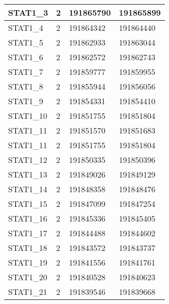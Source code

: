 \begin{longtable}{| p{} | C{.10\textwidth} | C{.35\textwidth} | C{.35\textwidth} |}
STAT1\_3                & 2            & 191865790             & 191865899           \\ \hline
STAT1\_4                & 2            & 191864342             & 191864440           \\ \hline
STAT1\_5                & 2            & 191862933             & 191863044           \\ \hline
STAT1\_6                & 2            & 191862572             & 191862743           \\ \hline
STAT1\_7                & 2            & 191859777             & 191859955           \\ \hline
STAT1\_8                & 2            & 191855944             & 191856056           \\ \hline
STAT1\_9                & 2            & 191854331             & 191854410           \\ \hline
STAT1\_10               & 2            & 191851755             & 191851804           \\ \hline
STAT1\_11               & 2            & 191851570             & 191851683           \\ \hline
STAT1\_11               & 2            & 191851755             & 191851804           \\ \hline
STAT1\_12               & 2            & 191850335             & 191850396           \\ \hline
STAT1\_13               & 2            & 191849026             & 191849129           \\ \hline
STAT1\_14               & 2            & 191848358             & 191848476           \\ \hline
STAT1\_15               & 2            & 191847099             & 191847254           \\ \hline
STAT1\_16               & 2            & 191845336             & 191845405           \\ \hline
STAT1\_17               & 2            & 191844488             & 191844602           \\ \hline
STAT1\_18               & 2            & 191843572             & 191843737           \\ \hline
STAT1\_19               & 2            & 191841556             & 191841761           \\ \hline
STAT1\_20               & 2            & 191840528             & 191840623           \\ \hline
STAT1\_21               & 2            & 191839546             & 191839668           \\ \hline

\end{longtable}

